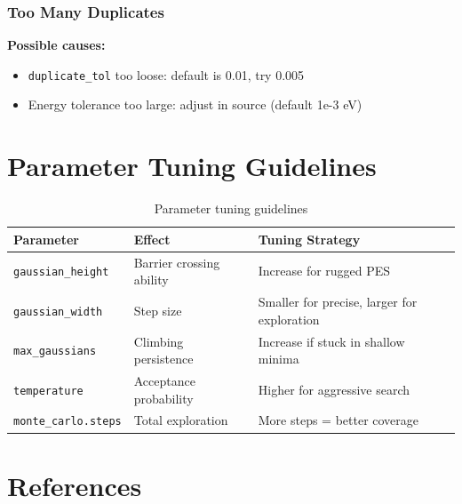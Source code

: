 \documentclass[11pt,a4paper]{article}
\begin{document}
\subsubsection{Too Many Duplicates}
\textbf{Possible causes:}
\begin{itemize}
    \item \texttt{duplicate\_tol} too loose: default is 0.01, try 0.005
    \item Energy tolerance too large: adjust in source (default 1e-3 eV)
\end{itemize}

\section{Parameter Tuning Guidelines}

\begin{table}[h]
\centering
\begin{tabular}{lll}
\toprule
\textbf{Parameter} & \textbf{Effect} & \textbf{Tuning Strategy} \\
\midrule
\texttt{gaussian\_height} & Barrier crossing ability & Increase for rugged PES \\
\texttt{gaussian\_width} & Step size & Smaller for precise, larger for exploration \\
\texttt{max\_gaussians} & Climbing persistence & Increase if stuck in shallow minima \\
\texttt{temperature} & Acceptance probability & Higher for aggressive search \\
\texttt{monte\_carlo.steps} & Total exploration & More steps = better coverage \\
\bottomrule
\end{tabular}
\caption{Parameter tuning guidelines}
\end{table}

\section{References}
\end{document}
